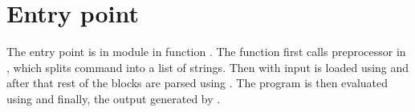 \section{Entry point}
The entry point is in module  in function . 
The function first calls preprocessor in , which splits command into a list of strings. Then  with input is loaded using  and after that
rest of the blocks are parsed using . The program is then evaluated using
 and finally, the output generated by .



